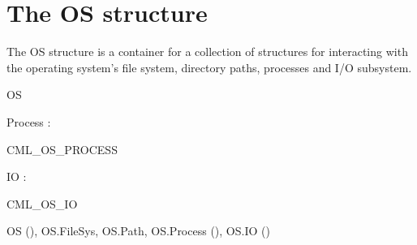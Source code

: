 \maybeclearpage
\section{The {\cf OS} structure}


The {\cf \small OS} structure is a container for a collection of structures for interacting with the operating system's file system, directory paths, processes and I/O subsystem. 
\begin{synopsis}
\item {} \label{sig-CML_OS}
\item {\STRUCTURE} \label{str-OS}
\end{synopsis}

\begin{interface}
\Nopagebreak
\item {}{\cf OS}\Nopagebreak
\item {\STRUCTURE} {\cf Process : }
\begin{signature}
CML\_\linebreak[0]OS\_\linebreak[0]PROCESS
\end{signature}
\END
\Nopagebreak
\item {\STRUCTURE} {\cf IO : }
\begin{signature}
CML\_\linebreak[0]OS\_\linebreak[0]IO
\end{signature}
\END
\end{interface}


\begin{seealso}
{\cf OS} (\pageref{sig-OS}), {\cf OS.\-File\-Sys}, {\cf OS.\-Path}, {\cf OS.\-Process} (\pageref{str-CML_OS.Process}), {\cf OS.\-IO} (\pageref{str-CML_OS.IO})
\end{seealso}
